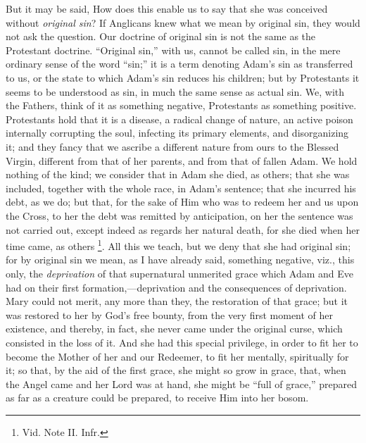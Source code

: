 But it may be said, How does this enable us to say that she was
conceived without \emph{original sin}? If Anglicans knew what we mean by
original sin, they would not ask the question. Our doctrine of original
sin is not the same as the Protestant doctrine. ``Original sin,'' with us, cannot be called sin, in the mere ordinary sense of
the word ``sin;'' it is a term denoting Adam's sin as
transferred to us, or the state to which Adam's sin reduces his
children; but by Protestants it seems to be understood as sin, in much
the same sense as actual sin. We, with the Fathers, think of it as
something negative, Protestants as something positive. Protestants hold
that it is a disease, a radical change of nature, an active poison
internally corrupting the soul, infecting its primary elements, and
disorganizing it; and they fancy that we ascribe a different nature from
ours to the Blessed Virgin, different from that of her parents, and from
that of fallen Adam. We hold nothing of the kind; we consider that in
Adam she died, as others; that she was included, together with the whole
race, in Adam's sentence; that she incurred his debt, as we do; but
that, for the sake of Him who was to redeem her and us upon the Cross,
to her the debt was remitted by anticipation, on her the sentence was
not carried out, except indeed as regards her natural death, for she
died when her time came, as others \footnote{Vid. Note
II. Infr.}. All this we teach, but we deny that she had original sin; for by
original sin we mean, as I have already said, something negative, viz.,
this only, the \emph{deprivation} of that supernatural unmerited grace
which Adam and Eve had on their first formation,—deprivation and the
consequences of deprivation. Mary could not merit, any more than they,
the restoration of that grace; but it was restored to her by God's free
bounty, from the very first moment of her existence, and thereby,
in fact, she never came under the original curse, which consisted in the
loss of it. And she had this special privilege, in order to fit her to
become the Mother of her and our Redeemer, to fit her mentally,
spiritually for it; so that, by the aid of the first grace, she might so
grow in grace, that, when the Angel came and her Lord was at hand, she
might be ``full of grace,'' prepared as far as a creature could
be prepared, to receive Him into her bosom.

